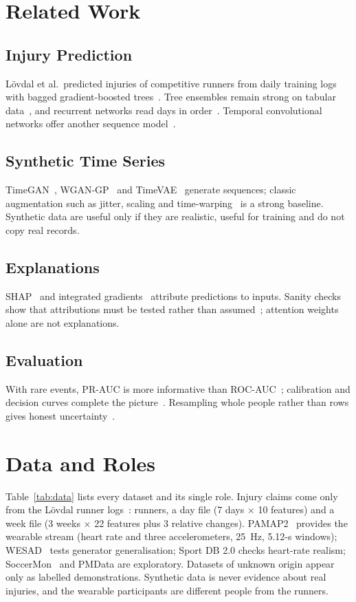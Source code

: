 \documentclass{ieeeaccess}
\begin{document}
\section{Related Work}
\subsection{Injury Prediction}
L\"ovdal et al.\ predicted injuries of competitive runners from daily training logs with bagged
gradient-boosted trees~\cite{lovdal2021,chen2016}. Tree ensembles remain strong on tabular
data~\cite{grinsztajn2022,breiman2001,prokhorenkova2018}, and recurrent networks read days in
order~\cite{cho2014}. Temporal convolutional networks offer another sequence
model~\cite{bai2018}.

\subsection{Synthetic Time Series}
TimeGAN~\cite{yoon2019}, WGAN-GP~\cite{gulrajani2017} and TimeVAE~\cite{desai2021} generate
sequences; classic augmentation such as jitter, scaling and time-warping~\cite{um2017} is a
strong baseline. Synthetic data are useful only if they are realistic, useful for training and
do not copy real records.

\subsection{Explanations}
SHAP~\cite{lundberg2017} and integrated gradients~\cite{sundararajan2017} attribute predictions
to inputs. Sanity checks show that attributions must be tested rather than
assumed~\cite{adebayo2018}; attention weights alone are not explanations.

\subsection{Evaluation}
With rare events, PR-AUC is more informative than ROC-AUC~\cite{saito2015,davis2006};
calibration and decision curves complete the picture~\cite{vancalster2019,vickers2006}.
Resampling whole people rather than rows gives honest uncertainty~\cite{field2007}.

\section{Data and Roles}
Table~\ref{tab:data} lists every dataset and its single role. Injury claims come only from the
L\"ovdal runner logs~\cite{lovdal2021data}: \lovdalRunners{} runners, a day file (7 days
$\times$ 10 features) and a week file (3 weeks $\times$ 22 features plus 3 relative changes).
PAMAP2~\cite{reiss2012} provides the wearable stream (heart rate and three accelerometers, 25~Hz,
5.12-s windows); WESAD~\cite{schmidt2018} tests generator generalisation; Sport DB 2.0 checks
heart-rate realism; SoccerMon~\cite{midoglu2024} and PMData are exploratory. Datasets of unknown
origin appear only as labelled demonstrations. Synthetic data is never evidence about real
injuries, and the wearable participants are different people from the runners.

\end{document}
